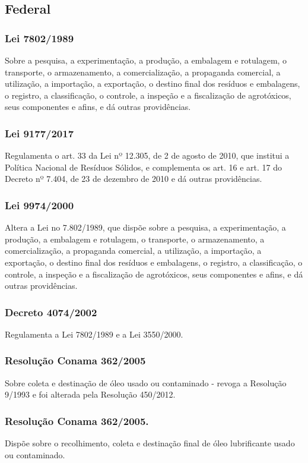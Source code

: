 \begin{subapend}
	\subsection{Federal}
	\begin{subsubapend}
		\item \subsubsection{Lei 7802/1989}
		Sobre a pesquisa, a experimentação, a produção, a embalagem e rotulagem, o transporte, o armazenamento, a comercialização, a propaganda comercial, a utilização, a importação, a exportação, o destino final dos resíduos e embalagens, o registro, a classificação, o controle, a inspeção e a fiscalização de agrotóxicos, seus componentes e afins, e dá outras providências.
		\subsubsection{Lei 9177/2017}
		Regulamenta o art. 33 da Lei nº 12.305, de 2 de agosto de 2010, que institui a Política Nacional de Resíduos Sólidos, e complementa os art. 16 e art. 17 do Decreto nº 7.404, de 23 de dezembro de 2010 e dá outras providências.
		\subsubsection{Lei 9974/2000}
		Altera a Lei no 7.802/1989, que dispõe sobre a pesquisa, a experimentação, a produção, a embalagem e rotulagem, o transporte, o armazenamento, a comercialização, a propaganda comercial, a utilização, a importação, a exportação, o destino final dos resíduos e embalagens, o registro, a classificação, o controle, a inspeção e a fiscalização de agrotóxicos, seus componentes e afins, e dá outras providências.
		\subsubsection{Decreto 4074/2002}
		Regulamenta a Lei 7802/1989 e a Lei 3550/2000.
		\subsubsection{Resolução Conama 362/2005}
		Sobre coleta e destinação de óleo usado ou contaminado - revoga a Resolução 9/1993 e foi alterada pela Resolução 450/2012.
		\subsubsection{Resolução Conama 362/2005.}
		Dispõe sobre o recolhimento, coleta e destinação final de óleo lubrificante usado ou contaminado.

\end{subsubapend}
\end{subapend}

